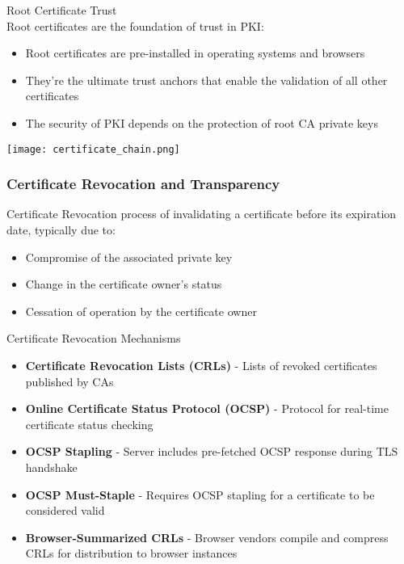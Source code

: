 \begin{theorem}{Root Certificate Trust}\\
Root certificates are the foundation of trust in PKI:
\begin{itemize}
    \item Root certificates are pre-installed in operating systems and browsers
    \item They're the ultimate trust anchors that enable the validation of all other certificates
    \item The security of PKI depends on the protection of root CA private keys
\end{itemize}
\end{theorem}





\texttt{[image: certificate\_chain.png]}

\multend









\subsubsection{Certificate Revocation and Transparency}



\begin{definition}{Certificate Revocation}
     process of invalidating a certificate before its expiration date, typically due to:
\begin{itemize}
    \item Compromise of the associated private key
    \item Change in the certificate owner's status
    \item Cessation of operation by the certificate owner
\end{itemize}
\end{definition}

\begin{theorem}{Certificate Revocation Mechanisms}
\begin{itemize}
    \item \textbf{Certificate Revocation Lists (CRLs)} - Lists of revoked certificates published by CAs
    \item \textbf{Online Certificate Status Protocol (OCSP)} - Protocol for real-time certificate status checking
    \item \textbf{OCSP Stapling} - Server includes pre-fetched OCSP response during TLS handshake
    \item \textbf{OCSP Must-Staple} - Requires OCSP stapling for a certificate to be considered valid
    \item \textbf{Browser-Summarized CRLs} - Browser vendors compile and compress CRLs for distribution to browser instances
\end{itemize}
\end{theorem}

